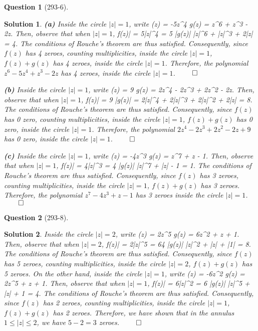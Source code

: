 \documentclass{article} %
\def\eQb#1\eQe{\begin{eqnarray*}#1\end{eqnarray*}}
\theoremstyle{quest}
\newtheorem*{question}{Question}
\newtheorem*{solution}{Solution}
\begin{document}
\bigskip

\begin{question}[293-6]
\end{question}
\begin{solution}
\textbf{(a)}
Inside the circle $|z| = 1$, write 
\eQb
f(z) = -5z^4 \>  \> g(z) = z^6 + z^3 - 2z.
\eQe
Then, observe that when $|z| = 1$,
\eQb
|f(z)| = 5|z|^4 = 5 \>  \> |g(z)| \leq |z|^6 + |z|^3 + 2|z| = 4.
\eQe
The conditions of Rouche's theorem are thus satisfied. Consequently, 
since $f(z)$ has 4 zeroes, counting multiplicities, inside the circle $|z| 
=1$, $f(z) + g(z)$ has 4 zeroes, inside the circle $|z| = 1$.
Therefore, the polynomial $z^6 -
5z^4 + z^3 - 2z$ has 4 zeroes, inside the circle $|z| = 1$.
\hfill $\qed$

\smallskip

\textbf{(b)}
Inside the circle $|z| = 1$, write
\eQb
f(z) = 9 \>  \> g(z) = 2z^4 - 2z^3 + 2z^2 - 2z.
\eQe 
Then, observe that when $|z| = 1$,
\eQb
|f(z)| = 9 \>  \> |g(z)| = 2|z|^4 + 2|z|^3 + 2|z|^2 + 2|z| = 8.
\eQe
The conditions of Rouche's theorem are thus satisfied. Consequently,
since $f(z)$ has 0 zero, counting multiplicities, inside the circle $|z| = 1$,
$f(z) + g(z)$ has 0 zero, inside the circle $|z| = 1$. Therefore, 
the polynomial $2z^4 - 2z^3 + 2z^2 - 2z + 9$ has 0 zero, inside
the circle $|z| = 1$.
\hfill $\qed$

\smallskip
\textbf{(c)} 
Inside the circle $|z| = 1$, write
\eQb
f(z) = -4z^3 \>  \> g(z) = z^7 + z - 1. 
\eQe
Then, observe that when $|z| = 1$, 
\eQb
|f(z)| = 4|z|^3 = 4 \>  |g(z)| \leq |z|^7 + |z| - 1 = 1.
\eQe
The conditions of Rouche's theorem are thus satisfied. Consequently,
since $f(z)$ has 3 zeroes, counting multiplicities, inside the circle
$|z| = 1$, $f(z) + g(z)$ has 3 zeroes. Therefore, the polynomial 
$z^7 - 4z^3 + z - 1$ has 3 zeroes inside the circle $|z| = 1$.
\hfill $\qed$

\end{solution}

\bigskip

\begin{question}[293-8]
\end{question}
\begin{solution}
Inside the circle $|z| = 2$, write
\eQb
f(z) = 2z^5 \>  \> g(z) = 6z^2 + z + 1.
\eQe
Then, observe that when $|z| = 2$,
\eQb
|f(z)| = 2|z|^5 = 64 \>  |g(z)| |z|^2 + |z| + |1| = 8.
\eQe
The conditions of Rouche's theorem are thus satisfied. Consequently, since
$f(z)$ has 5 zeroes, counting multiplicities, inside the circle $|z| = 2$,
$f(z) + g(z)$ has 5 zeroes. On the other hand, inside the circle $|z| = 1$,
write
\eQb
f(z) = -6z^2 \>  \> g(z) = 2z^5 + z + 1.
\eQe
Then, observe that when $|z| = 1$,
\eQb
|f(z)| = 6|z|^2 = 6 \>  |g(z)| |z|^5 + |z| + 1 = 4.
\eQe
The conditions of Rouche's theorem are thus satisfied. Consequently, since
$f(z)$ has 2 zeroes, counting multiplicities, inside the circle $|z| = 1 $,
$f(z) + g(z)$ has 2 zeroes. Therefore, we have shown that
in the annulus $1 \leq |z| \leq 2$, we have $5 - 2 = 3$ zeroes. 
\hfill $\qed$
\end{solution}
\end{document}
